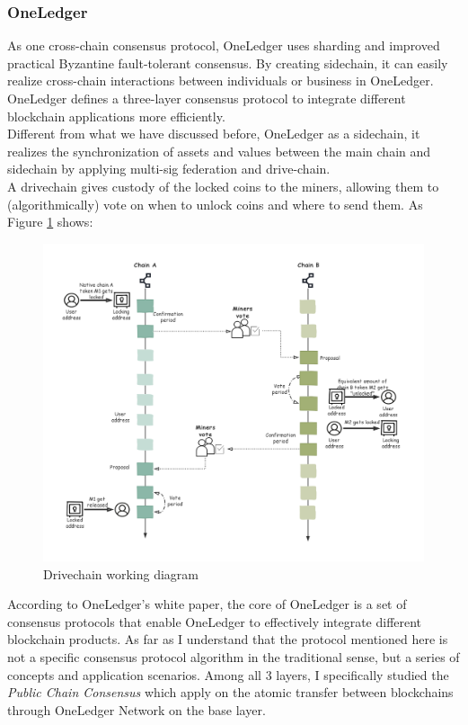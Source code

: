 \subsubsection{OneLedger}
\noindent As one cross-chain consensus protocol, OneLedger\cite{Oneledger} uses sharding and improved practical Byzantine fault-tolerant consensus. By creating sidechain, it can easily realize cross-chain interactions between individuals or business in OneLedger. OneLedger defines a three-layer consensus protocol to integrate different blockchain applications more efficiently.\\
\noindent Different from what we have discussed before, OneLedger as a sidechain, it realizes the synchronization of assets and values between the main chain and sidechain by applying multi-sig federation and drive-chain.\\
\noindent A drivechain\cite{lerner2016drivechains} gives custody of the locked coins to the miners, allowing them to (algorithmically) vote on when to unlock coins and where to send them. As Figure \ref{fig:drive} shows:
        \begin{figure}[H]
        \includegraphics[width=1\textwidth]{./figures/drive.png}
        \centering
        \caption{Drivechain  working diagram}%
        \centering
        \label{fig:drive}
        \end{figure}
\noindent According to OneLedger's white paper, the core of OneLedger is a set of consensus protocols that enable OneLedger to effectively integrate different blockchain products. As far as I understand that the protocol mentioned here is not a specific consensus protocol algorithm in the traditional sense, but a series of concepts and application scenarios. Among all 3 layers, I specifically studied the \textit{Public Chain Consensus} which apply on the atomic transfer between blockchains through OneLedger Network on the base layer.
